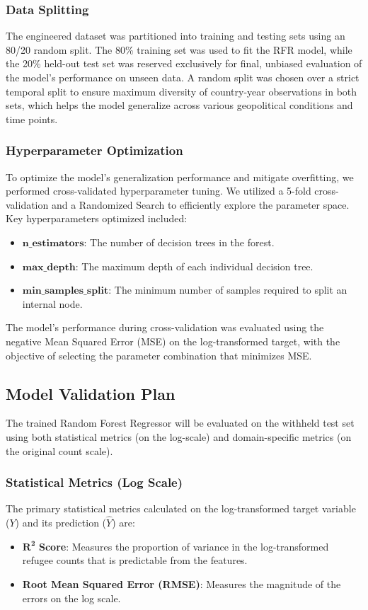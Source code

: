 \documentclass{article}
\theoremstyle{plain}
\theoremstyle{definition}
\theoremstyle{remark}
\begin{document}
\subsubsection*{Data Splitting}
The engineered dataset was partitioned into training and testing sets using an 80/20 random split. The 80\% training set was used to fit the RFR model, while the 20\% held-out test set was reserved exclusively for final, unbiased evaluation of the model's performance on unseen data. A random split was chosen over a strict temporal split to ensure maximum diversity of country-year observations in both sets, which helps the model generalize across various geopolitical conditions and time points.

\subsubsection*{Hyperparameter Optimization}
To optimize the model’s generalization performance and mitigate overfitting, we performed cross-validated hyperparameter tuning. We utilized a 5-fold cross-validation and a Randomized Search to efficiently explore the parameter space. Key hyperparameters optimized included:
\begin{itemize}
    \item \textbf{$\mathbf{n\_{estimators}}$}: The number of decision trees in the forest.
    \item $\mathbf{max\_{depth}}$: The maximum depth of each individual decision tree.
    \item $\mathbf{min\_{samples\_split}}$: The minimum number of samples required to split an internal node.
\end{itemize}
The model's performance during cross-validation was evaluated using the negative Mean Squared Error (MSE) on the log-transformed target, with the objective of selecting the parameter combination that minimizes MSE.

\subsection{Model Validation Plan}
The trained Random Forest Regressor will be evaluated on the withheld test set using both statistical metrics (on the log-scale) and domain-specific metrics (on the original count scale).

\subsubsection*{Statistical Metrics (Log Scale)}
The primary statistical metrics calculated on the log-transformed target variable ($Y$) and its prediction ($\hat{Y}$) are:
\begin{itemize}
    \item $\mathbf{R^2}$ \textbf{Score}: Measures the proportion of variance in the log-transformed refugee counts that is predictable from the features.
    \item \textbf{Root Mean Squared Error (RMSE)}: Measures the magnitude of the errors on the log scale.
\end{itemize}
\end{document}
